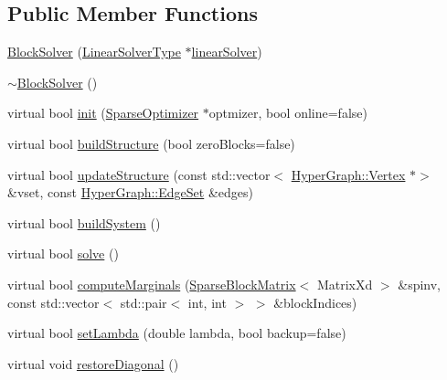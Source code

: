 \subsection*{Public Member Functions}
\begin{DoxyCompactItemize}
\item 
\mbox{\hyperlink{classg2o_1_1_block_solver_a04701a223a14708c9c84ce4d7e7af3f6}{Block\+Solver}} (\mbox{\hyperlink{classg2o_1_1_block_solver_a717fa8cb1dd5a212e41d8ebef67955e6}{Linear\+Solver\+Type}} $\ast$\mbox{\hyperlink{classg2o_1_1_block_solver_af71279eea2391daa4d7528da28107f1c}{linear\+Solver}})
\item 
\mbox{\hyperlink{classg2o_1_1_block_solver_a7587b13ec3494c00ad95a3d0ce7fd9a9}{$\sim$\+Block\+Solver}} ()
\item 
virtual bool \mbox{\hyperlink{classg2o_1_1_block_solver_a8bf01018abc3bfddfa3b29a380a1d6cb}{init}} (\mbox{\hyperlink{classg2o_1_1_sparse_optimizer}{Sparse\+Optimizer}} $\ast$optmizer, bool online=false)
\item 
virtual bool \mbox{\hyperlink{classg2o_1_1_block_solver_a17e4392d3cca9a9d7cf38bb46d073b86}{build\+Structure}} (bool zero\+Blocks=false)
\item 
virtual bool \mbox{\hyperlink{classg2o_1_1_block_solver_a662473598270cdf89075607f87440759}{update\+Structure}} (const std\+::vector$<$ \mbox{\hyperlink{classg2o_1_1_hyper_graph_1_1_vertex}{Hyper\+Graph\+::\+Vertex}} $\ast$$>$ \&vset, const \mbox{\hyperlink{classg2o_1_1_hyper_graph_a5e2970e236c0dcb4eff7c205d7b6b4ae}{Hyper\+Graph\+::\+Edge\+Set}} \&edges)
\item 
virtual bool \mbox{\hyperlink{classg2o_1_1_block_solver_a2654a8d52f38e5ce23720a8de302e2e7}{build\+System}} ()
\item 
virtual bool \mbox{\hyperlink{classg2o_1_1_block_solver_a589a75a131cce100c1945ad2786214d7}{solve}} ()
\item 
virtual bool \mbox{\hyperlink{classg2o_1_1_block_solver_ac21cd7e2c9b8a1414f7a2dccb0d30a0e}{compute\+Marginals}} (\mbox{\hyperlink{classg2o_1_1_sparse_block_matrix}{Sparse\+Block\+Matrix}}$<$ Matrix\+Xd $>$ \&spinv, const std\+::vector$<$ std\+::pair$<$ int, int $>$ $>$ \&block\+Indices)
\item 
virtual bool \mbox{\hyperlink{classg2o_1_1_block_solver_acc63a23e5b35e4f72d46dc22719aa56f}{set\+Lambda}} (double lambda, bool backup=false)
\item 
virtual void \mbox{\hyperlink{classg2o_1_1_block_solver_a2136931d7aa2f54df5207556c4685809}{restore\+Diagonal}} ()
\item 
$$
\end{DoxyCompactItemize}
